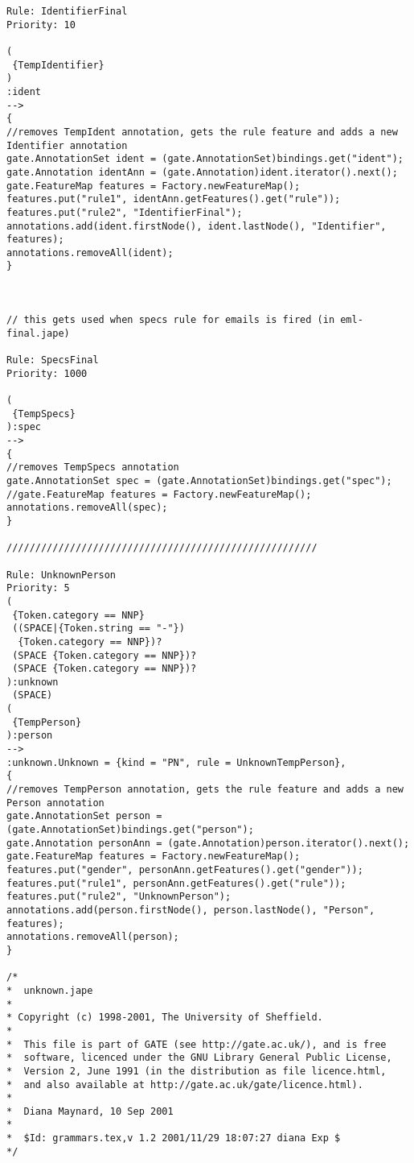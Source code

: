 \begin{verbatim}
Rule: IdentifierFinal
Priority: 10

(
 {TempIdentifier}
)
:ident
-->
{
//removes TempIdent annotation, gets the rule feature and adds a new Identifier annotation
gate.AnnotationSet ident = (gate.AnnotationSet)bindings.get("ident");
gate.Annotation identAnn = (gate.Annotation)ident.iterator().next();
gate.FeatureMap features = Factory.newFeatureMap();
features.put("rule1", identAnn.getFeatures().get("rule"));
features.put("rule2", "IdentifierFinal");
annotations.add(ident.firstNode(), ident.lastNode(), "Identifier",
features);
annotations.removeAll(ident);
}



// this gets used when specs rule for emails is fired (in eml-final.jape) 

Rule: SpecsFinal
Priority: 1000

(
 {TempSpecs}
):spec
-->
{
//removes TempSpecs annotation
gate.AnnotationSet spec = (gate.AnnotationSet)bindings.get("spec");
//gate.FeatureMap features = Factory.newFeatureMap();
annotations.removeAll(spec);
}

//////////////////////////////////////////////////////

Rule: UnknownPerson
Priority: 5
( 
 {Token.category == NNP}
 ((SPACE|{Token.string == "-"})
  {Token.category == NNP})?
 (SPACE {Token.category == NNP})?
 (SPACE {Token.category == NNP})?
):unknown
 (SPACE)
(
 {TempPerson}
):person
-->
:unknown.Unknown = {kind = "PN", rule = UnknownTempPerson},
{
//removes TempPerson annotation, gets the rule feature and adds a new Person annotation
gate.AnnotationSet person = (gate.AnnotationSet)bindings.get("person");
gate.Annotation personAnn = (gate.Annotation)person.iterator().next();
gate.FeatureMap features = Factory.newFeatureMap();
features.put("gender", personAnn.getFeatures().get("gender"));
features.put("rule1", personAnn.getFeatures().get("rule"));
features.put("rule2", "UnknownPerson");
annotations.add(person.firstNode(), person.lastNode(), "Person",
features);
annotations.removeAll(person);
}

/*
*  unknown.jape
*
* Copyright (c) 1998-2001, The University of Sheffield.
*
*  This file is part of GATE (see http://gate.ac.uk/), and is free
*  software, licenced under the GNU Library General Public License,
*  Version 2, June 1991 (in the distribution as file licence.html,
*  and also available at http://gate.ac.uk/gate/licence.html).
*
*  Diana Maynard, 10 Sep 2001
* 
*  $Id: grammars.tex,v 1.2 2001/11/29 18:07:27 diana Exp $
*/


\end{verbatim}
